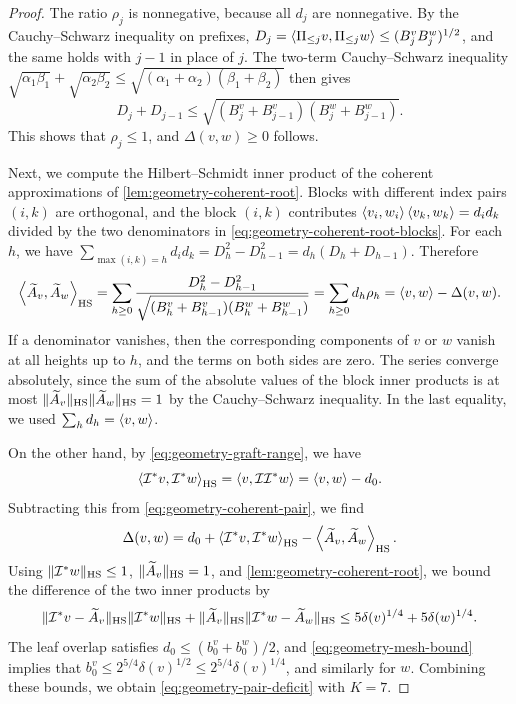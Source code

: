 \begin{proof}
The ratio $\rho_j$ is nonnegative, because all $d_j$ are nonnegative. By the Cauchy--Schwarz inequality on prefixes, $D_j=\left\langle\Pi_{\le j}v,\Pi_{\le j}w\right\rangle\le(B_j^vB_j^w)^{1/2}$, and the same holds with $j-1$ in place of $j$. The two-term Cauchy--Schwarz inequality $\sqrt{\alpha_1\beta_1}+\sqrt{\alpha_2\beta_2}\le\sqrt{(\alpha_1+\alpha_2)(\beta_1+\beta_2)}$ then gives
\[
 D_j+D_{j-1}\le\sqrt{(B_j^v+B_{j-1}^v)(B_j^w+B_{j-1}^w)} .
\]
This shows that $\rho_j\le1$, and $\Delta(v,w)\ge0$ follows.

Next, we compute the Hilbert--Schmidt inner product of the coherent approximations of \cref{lem:geometry-coherent-root}. Blocks with different index pairs $(i,k)$ are orthogonal, and the block $(i,k)$ contributes $\left\langle v_i,w_i\right\rangle\left\langle v_k,w_k\right\rangle=d_id_k$ divided by the two denominators in \eqref{eq:geometry-coherent-root-blocks}. For each $h$, we have $\sum_{\max(i,k)=h}d_id_k=D_h^2-D_{h-1}^2=d_h(D_h+D_{h-1})$. Therefore
\begin{equation}\label{eq:geometry-coherent-pair}
 \left\langle\widetilde A_v,\widetilde A_w\right\rangle_{\mathrm{HS}}
 =\sum_{h\ge0}\frac{D_h^2-D_{h-1}^2}{\sqrt{(B_h^v+B_{h-1}^v)(B_h^w+B_{h-1}^w)}}
 =\sum_{h\ge0}d_h\rho_h
 =\left\langle v,w\right\rangle-\Delta(v,w).
\end{equation}
If a denominator vanishes, then the corresponding components of $v$ or $w$ vanish at all heights up to $h$, and the terms on both sides are zero. The series converge absolutely, since the sum of the absolute values of the block inner products is at most $\lVert\widetilde A_v\rVert_{\mathrm{HS}}\lVert\widetilde A_w\rVert_{\mathrm{HS}}=1$ by the Cauchy--Schwarz inequality. In the last equality, we used $\sum_hd_h=\left\langle v,w\right\rangle$.

On the other hand, by \eqref{eq:geometry-graft-range}, we have
\[
 \left\langle\mathcal I^*v,\mathcal I^*w\right\rangle_{\mathrm{HS}}=\left\langle v,\mathcal I\mathcal I^*w\right\rangle=\left\langle v,w\right\rangle-d_0 .
\]
Subtracting this from \eqref{eq:geometry-coherent-pair}, we find
\[
 \Delta(v,w)=d_0+\left\langle\mathcal I^*v,\mathcal I^*w\right\rangle_{\mathrm{HS}}-\left\langle\widetilde A_v,\widetilde A_w\right\rangle_{\mathrm{HS}}.
\]
Using $\lVert\mathcal I^*w\rVert_{\mathrm{HS}}\le1$, $\lVert\widetilde A_v\rVert_{\mathrm{HS}}=1$, and \cref{lem:geometry-coherent-root}, we bound the difference of the two inner products by
\[
 \lVert\mathcal I^*v-\widetilde A_v\rVert_{\mathrm{HS}}\lVert\mathcal I^*w\rVert_{\mathrm{HS}}+\lVert\widetilde A_v\rVert_{\mathrm{HS}}\lVert\mathcal I^*w-\widetilde A_w\rVert_{\mathrm{HS}}
 \le5\delta(v)^{1/4}+5\delta(w)^{1/4} .
\]
The leaf overlap satisfies $d_0\le(b_0^v+b_0^w)/2$, and \eqref{eq:geometry-mesh-bound} implies that $b_0^v\le2^{5/4}\delta(v)^{1/2}\le2^{5/4}\delta(v)^{1/4}$, and similarly for $w$. Combining these bounds, we obtain \eqref{eq:geometry-pair-deficit} with $K=7$.
\end{proof}

